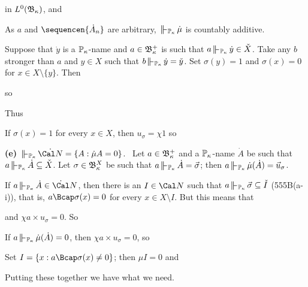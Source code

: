 {\noindent in $L^0(\frak B_{\kappa})$, and


\noindent As $a$ and $\sequencen{\dot A_n}$ are arbitrary,
$\VVdPk\,\dot\mu$ is countably additive.\ \Qed

\medskip

 Suppose that
$\dot y$ is a $\Bbb P_{\kappa}$-name and $a\in\frak B_{\kappa}^+$ is such
that $a\VVdPk\,\dot y\in\check X$.   Take any $b$ stronger than
$a$ and $y\in X$ such that $b\VVdPk\,\dot y=\check y$.
Set $\sigma(y)=1$ and
$\sigma(x)=0$ for $x\in X\setminus\{y\}$.   Then


\noindent so


\noindent Thus


\medskip

 If $\sigma(x)=1$ for every $x\in X$, then
$u_{\sigma}=\chi 1$ so


\medskip

{\bf (e)} $\VVdPk\,\dot{\Cal N}=\{A:\dot\mu A=0\}$.   \Prf\ Let
$a\in\frak B_{\kappa}^+$ and a $\Bbb P_{\kappa}$-name $\dot A$ be such that
$a\VVdPk\,\dot A\subseteq\check X$.   Let
$\sigma\in\frak B_{\kappa}^X$ be such that
$a\VVdPk\,\dot A=\vec\sigma$;  then
$a\VVdPk\,\dot\mu(\dot A)=\vec u_{\sigma}$.

\medskip

 If $a\VVdPk\,\dot A\in\dot\Cal N$, then there is an
$I\in\Cal N$ such that
$a\VVdPk\,\vec\sigma\subseteq\check I$ (555B(a-i)),
that is, $a\Bcap\sigma(x)=0$ for
every $x\in X\setminus I$.   But this means that


\noindent and $\chi a\times u_{\sigma}=0$.   So


\medskip

 If $a\VVdPk\,\dot\mu(\dot A)=0$, then
$\chi a\times u_{\sigma}=0$, so


\noindent Set $I=\{x:a\Bcap\sigma(x)\ne 0\}$;  then $\mu I=0$ and


\noindent Putting these together we have what we need.\ \Qed
}%

